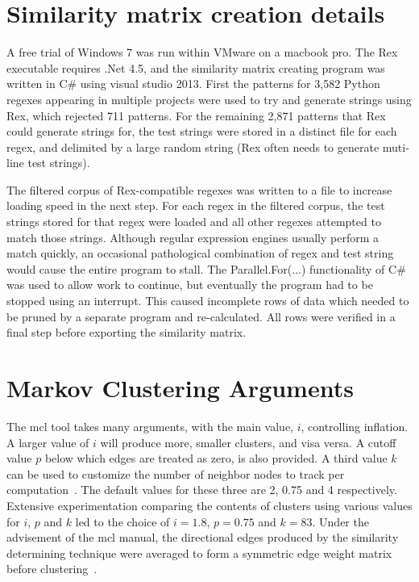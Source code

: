 \section*{Similarity matrix creation details}
\label{app:similarityMatrixCreation}

A free trial of Windows 7 was run within VMware on a macbook pro.  The Rex~ executable requires .Net 4.5, and the similarity matrix creating program was written in C\# using visual studio 2013.  First the patterns for 3,582 Python regexes appearing in multiple projects were used to try and generate strings using Rex, which rejected 711 patterns.  For the remaining 2,871 patterns that Rex could generate strings for, the test strings were stored in a distinct file for each regex, and delimited by a large random string (Rex often needs to generate muti-line test strings).

The filtered corpus of Rex-compatible regexes was written to a file to increase loading speed in the next step.  For each regex in the filtered corpus, the test strings stored for that regex were loaded and all other regexes attempted to match those strings.  Although regular expression engines usually perform a match quickly, an occasional pathological combination of regex and test string would cause the entire program to stall.  The Parallel.For(...) functionality of C\# was used to allow work to continue, but eventually the program had to be stopped using an interrupt.  This caused incomplete rows of data which needed to be pruned by a separate program and re-calculated.  All rows were verified in a final step before exporting the similarity matrix.

\section*{Markov Clustering Arguments}
\label{app:mclTuning}

The mcl tool takes many arguments, with the main value, $i$, controlling inflation.  A larger value of $i$ will produce more, smaller clusters, and visa versa.  A cutoff value $p$ below which edges are treated as zero, is also provided.  A third value $k$ can be used to customize the number of neighbor nodes to track per computation~.  The default values for these three are 2, 0.75 and 4 respectively.  Extensive experimentation comparing the contents of clusters using various values for $i$, $p$ and $k$ led to the choice of $i=1.8$, $p=0.75$ and $k=83$.  Under the advisement of the mcl manual, the directional edges produced by the similarity determining technique were averaged to form a symmetric edge weight matrix before clustering~.
